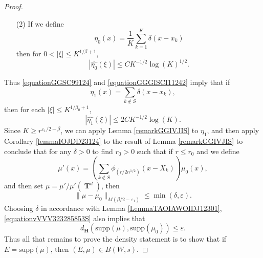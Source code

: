 \documentclass[12pt,reqno]{article}
\numberwithin{equation}{section}
\DeclareMathOperator{\TT}{\mathbf{T}}
\numberwithin{theorem}{section}
\begin{document}
\begin{proof}
\begin{itemize}
        \item[(2)] If we define
        \[ \eta_0(x) = \frac{1}{K} \sum_{k = 1}^K \delta(x - x_k) \]
        then for $0 < |\xi| \leq K^{1/\beta + 1}$,
        \begin{equation} \label{equationGGGISCI11242}
            |\widehat{\eta_0}(\xi)| \leq C K^{-1/2} \log(K)^{1/2}.
        \end{equation}
    \end{itemize}
    Thus \eqref{equationGGSC99124} and \eqref{equationGGGISCI11242} imply that if
    \[ \eta_1(x) = \sum_{k \not \in S} \delta(x - x_k), \]
    then for each $|\xi| \leq K^{1/\beta_0 + 1}$,
    \begin{equation} \label{equationGGSCSIAXAXXXSFGG}
        |\widehat{\eta_1}(\xi)| \leq 2C K^{-1/2} \log(K).
    \end{equation}
    Since $K \geq r^{\varepsilon_1/2 - \beta}$, we can apply Lemma \ref{remarkGGIVJIS} to $\eta_1$, and then apply Corollary \ref{lemmaIOJDD23124} to the result of Lemma \ref{remarkGGIVJIS} to conclude that for any $\delta > 0$ to find $r_0 > 0$ %
    such that if $r \leq r_0$ and we define
    \[ \mu'(x) = \left( \sum_{k \not \in S} \phi_{(r/2n^{1/2})}(x - X_k) \right) \mu_0(x), \]
    and then set $\mu = \mu' / \mu'(\TT^d)$, then
    \begin{equation} \label{equationvVVV323285853S}
        \| \mu - \mu_0 \|_{M(\beta/2 - \varepsilon_1)} \leq \min(\delta,\varepsilon).
    \end{equation}
    Choosing $\delta$ in accordance with Lemma \ref{LemmaTAOIAWOIDJ12301}, \eqref{equationvVVV323285853S} also implies that
    \[ d_\mathbf{H}(\text{supp}(\mu), \text{supp}(\mu_0)) \leq \varepsilon. \]
    Thus all that remains to prove the density statement is to show that if $E = \text{supp}(\mu)$, then $(E,\mu) \in B(W,s)$.


\end{proof}
\end{document}
